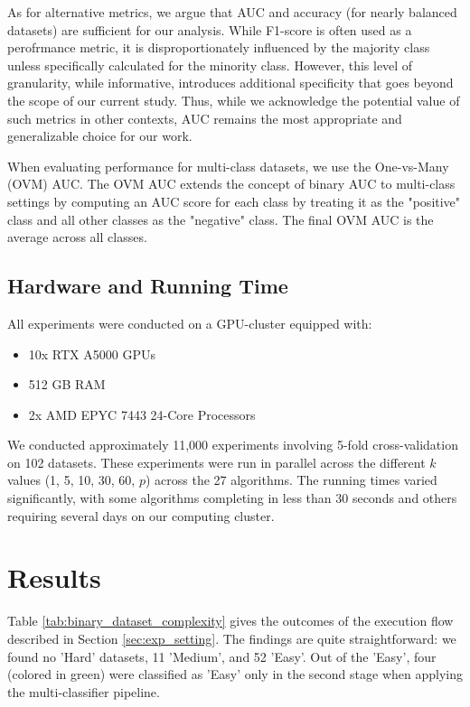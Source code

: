 \documentclass[preprint,12pt,authoryear]{elsarticle}
\begin{document}
As for alternative metrics, we argue that AUC and accuracy (for nearly balanced datasets) are sufficient for our analysis. While F1-score is often used as a perofrmance metric, it is disproportionately influenced by the majority class unless specifically calculated for the minority class. However, this level of granularity, while informative, introduces additional specificity that goes beyond the scope of our current study. Thus, while we acknowledge the potential value of such metrics in other contexts, AUC remains the most appropriate and generalizable choice for our work.

When evaluating performance for multi-class datasets, we use the One-vs-Many (OVM) AUC. The OVM AUC extends the concept of binary AUC to multi-class settings by computing an AUC score for each class by treating it as the "positive" class and all other classes as the "negative" class. The final OVM AUC is the average across all classes.




\subsection{Hardware and Running Time}
All experiments were conducted on a GPU-cluster equipped with:
\begin{itemize}
    \item 10x RTX A5000 GPUs
    \item 512 GB RAM
    \item 2x AMD EPYC 7443 24-Core Processors
\end{itemize}

We conducted approximately 11,000 experiments involving 5-fold cross-validation on 102 datasets. These experiments were run in parallel across the different $k$ values (1, 5, 10, 30, 60, $p$) across the 27 algorithms. The running times varied significantly, with some algorithms completing in less than 30 seconds and others requiring several days on our computing cluster. 



\section{Results}\label{sec:results}
Table \ref{tab:binary_dataset_complexity} gives the outcomes of the execution flow described in Section \ref{sec:exp_setting}. The findings are quite straightforward: we found no 'Hard' datasets, 11 'Medium', and 52 'Easy'. Out of the 'Easy', four (colored in green) were classified as 'Easy' only in the second stage when applying the multi-classifier pipeline.
\end{document}
